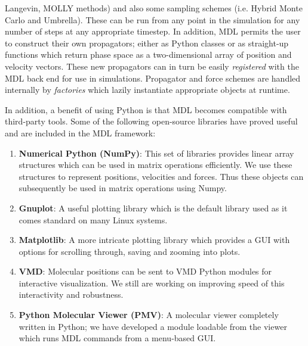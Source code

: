 \documentclass[11pt]{report}
\begin{document}
\begin{enumerate}
Langevin, MOLLY methods) and also some sampling schemes (i.e. Hybrid Monte
Carlo and Umbrella).  These can be run from any point in the simulation
for any number of steps at any appropriate timestep.  In addition, MDL
permits the user to construct their own propagators; either as Python classes
or as straight-up functions which return phase space as a two-dimensional
array of position and velocity vectors.  These new propagators can in turn
be easily {\it registered} with the MDL back end for use in simulations.
Propagator and force schemes are handled internally by {\it factories}
which lazily instantiate appropriate objects at runtime.
\end{enumerate}

In addition, a benefit of using Python is that MDL becomes
compatible with third-party tools.  Some of the following open-source
libraries have proved useful and are included in the MDL framework:

\begin{enumerate}
\item {\bf Numerical Python (NumPy)}: This set of libraries
provides linear array structures which can be used in matrix operations
efficiently.  We use these structures to represent positions, velocities
and forces.  Thus these objects can subsequently be used in matrix
operations using Numpy.
\item {\bf Gnuplot}: A useful plotting library which is the default
library used as it comes standard on many Linux systems.
\item {\bf Matplotlib}: A more intricate plotting library which provides
a GUI with options for scrolling through, saving and zooming into
plots.
\item {\bf VMD}: Molecular positions can be sent to VMD Python
modules for interactive visualization.  We still are working on improving
speed of this interactivity and robustness.
\item {\bf Python Molecular Viewer (PMV)}: A molecular viewer completely
written in Python; we have developed a module loadable from the viewer
which runs MDL commands from a menu-based GUI.
\end{enumerate}
\end{document}
